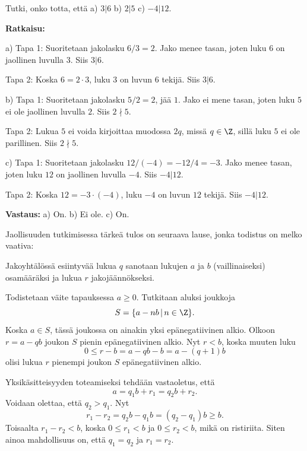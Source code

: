 \begin{esimerkki}
 Tutki, onko totta, että a)  $3 | 6$  b)  $2 | 5$ c) $-4|12$.

{\bf Ratkaisu:}

a) Tapa 1: Suoritetaan jakolasku $6/3= 2$. Jako menee tasan, joten luku $6$ on jaollinen luvulla $3$. Siis $3 | 6$.

Tapa 2: Koska $6 = 2 \cdot 3$, luku $3$ on luvun $6$ tekijä. Siis $3 | 6$.

b) Tapa 1: Suoritetaan jakolasku $5/2 = 2$, jää $1$. Jako ei mene tasan, joten luku $5$ ei ole jaollinen luvulla $2$. Siis $2 \nmid 5$.

Tapa 2: Lukua $5$ ei voida kirjoittaa muodossa $2q$, missä $q\in\Z$, sillä luku $5$ ei ole parillinen. Siis $2 \nmid 5$.

c) 
Tapa 1: Suoritetaan jakolasku $12/(-4)=-12/4= -3$. Jako menee tasan, joten luku $12$ on jaollinen luvulla $-4$. Siis $-4 | 12$.

Tapa 2: Koska $12 = -3 \cdot (-4)$, luku $-4$ on luvun $12$ tekijä. Siis $-4 | 12$.

{\bf Vastaus:} a) On.  b) Ei ole. c) On.
\end{esimerkki}

Jaollisuuden tutkimisessa tärkeä tulos on seuraava lause, jonka todistus on melko vaativa:


Jakoyhtälössä esiintyvää lukua $q$ sanotaan lukujen $a$ ja $b$ (vaillinaiseksi) osamääräksi ja lukua $r$  jakojäännökseksi.


\begin{todistus}%
Todistetaan väite tapauksessa $a\ge 0$. Tutkitaan aluksi joukkoja
\[
S = \{ a-nb\,|\, n\in \Z\}.
\]
Koska $a\in S$, tässä joukossa on ainakin yksi epänegatiivinen alkio. Olkoon $r=a-qb$ joukon $S$ pienin epänegatiivinen alkio. Nyt $r < b$, koska muuten luku 
\[
0\le r - b = a - qb - b = a - (q+1)b 
\]
olisi lukua $r$ pienempi joukon $S$ epänegatiivinen alkio.

Yksikäsitteisyyden toteamiseksi tehdään vastaoletus, että
\[
a= q_1b+r_1 = q_2b+r_2.
\]
Voidaan olettaa, että $q_2>q_1$. Nyt
\[
r_1 - r_2 = q_2b - q_1b = (q_2-q_1)b \ge b.
\]
Toisaalta $r_1-r_2<b$, koska $0\le r_1 < b$ ja $0\le r_2 < b$, mikä on ristiriita. Siten ainoa mahdollisuus on, että $q_1=q_2$ ja $r_1=r_2$.
\end{todistus}

